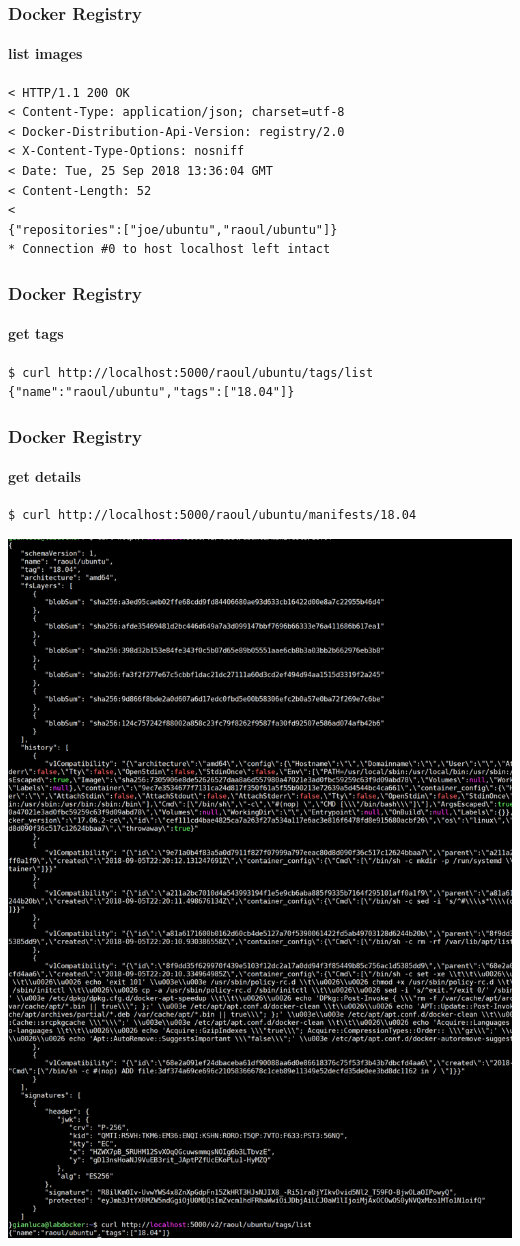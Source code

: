 \begin{frame}[fragile]
\frametitle{Docker Registry}
\framesubtitle{list images}

\begin{lstlisting}
< HTTP/1.1 200 OK
< Content-Type: application/json; charset=utf-8
< Docker-Distribution-Api-Version: registry/2.0
< X-Content-Type-Options: nosniff
< Date: Tue, 25 Sep 2018 13:36:04 GMT
< Content-Length: 52
<
{"repositories":["joe/ubuntu","raoul/ubuntu"]}
* Connection #0 to host localhost left intact
\end{lstlisting}
\end{frame}

\begin{frame}[fragile]
\frametitle{Docker Registry}
\framesubtitle{get tags}

\begin{lstlisting}
$ curl http://localhost:5000/raoul/ubuntu/tags/list
{"name":"raoul/ubuntu","tags":["18.04"]}
\end{lstlisting}
\end{frame}

\begin{frame}[fragile]
\frametitle{Docker Registry}
\framesubtitle{get details}

\begin{lstlisting}
$ curl http://localhost:5000/raoul/ubuntu/manifests/18.04
\end{lstlisting}

\includegraphics[width=0.8\columnwidth]{./Figure/RegistryDetails}
\end{frame}

